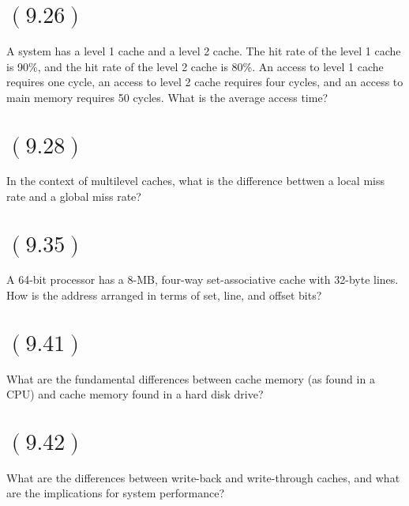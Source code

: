 \documentclass[letterpaper,12pt,titlepage]{article}
\begin{document}
\section*{$(9.26)$} A system has a level 1 cache and a level 2 cache. The hit rate of the level 1 cache is 90\%, and the hit rate of the level 2 cache is 80\%. An access to level 1 cache requires one cycle, an access to level 2 cache requires four cycles, and an access to main memory requires 50 cycles. What is the average access time?

\begin{mdframed}[style=MyFrame]
\end{mdframed}

\section*{$(9.28)$} In the context of multilevel caches, what is the difference bettwen a local miss rate and a global miss rate?

\begin{mdframed}[style=MyFrame]
\end{mdframed}

\section*{$(9.35)$} A 64-bit processor has a 8-MB, four-way set-associative cache with 32-byte lines. How is the address arranged in terms of set, line, and offset bits?

\begin{mdframed}[style=MyFrame]
\end{mdframed}

\section*{$(9.41)$} What are the fundamental differences between cache memory (as found in a CPU) and cache memory found in a hard disk drive?

\begin{mdframed}[style=MyFrame]
\end{mdframed}

\section*{$(9.42)$} What are the differences between write-back and write-through caches, and what are the implications for system performance?
\end{document}
